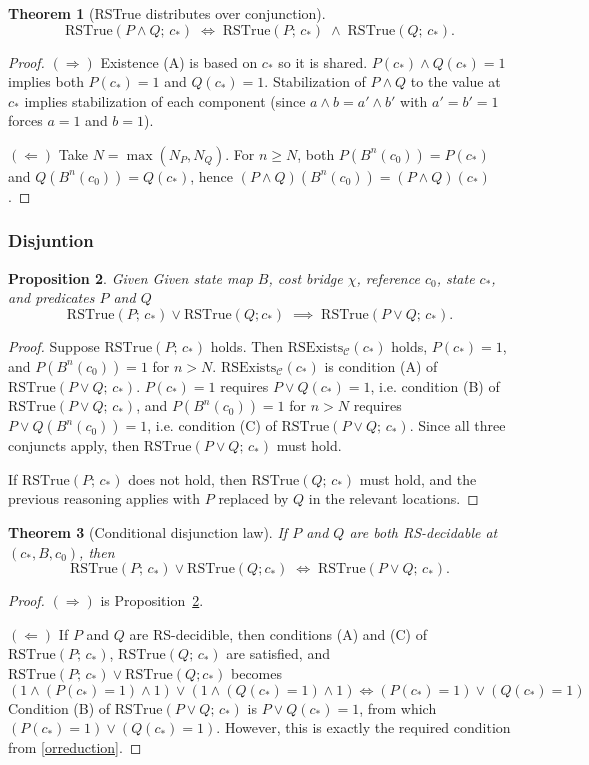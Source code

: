\documentclass[11pt,a4paper]{article}
\newcommand{\RSExists}{\mathrm{RSExists}}
\newcommand{\RSTrue}{\mathrm{RSTrue}}
\newtheorem{theorem}{Theorem}[section]
\newtheorem{proposition}[theorem]{Proposition}
\begin{document}
\begin{theorem}[RSTrue distributes over conjunction]\label{thm:and}
\[
  \RSTrue(P\land Q;\,c_*)
  \;\Longleftrightarrow\;
  \RSTrue(P;\,c_*) \;\land\; \RSTrue(Q;\,c_*).
\]
\end{theorem}
\begin{proof}
$(\Rightarrow)$  Existence (A) is based on $c_*$ so it is shared.  $P(c_*)\land Q(c_*)=1$
implies both $P(c_*)=1$ and $Q(c_*)=1$.  Stabilization of
$P\land Q$ to the value at $c_*$ implies stabilization of each
component (since $a\land b = a'\land b'$ with $a'=b'=1$ forces
$a=1$ and $b=1$).

$(\Leftarrow)$  Take $N=\max(N_P,N_Q)$.  For $n\ge N$, both
$P(B^n(c_0))=P(c_*)$ and $Q(B^n(c_0))=Q(c_*)$, hence
$(P\land Q)(B^n(c_0))=(P\land Q)(c_*)$.
\end{proof}

\subsubsection{Disjuntion}
\begin{proposition}
    Given Given state map $B$, cost bridge $\chi$, reference $c_0$, state $c_*$, and predicates $P$ and $Q$ \label{prop:or}
\[
  \RSTrue(P;\,c_*)\lor \RSTrue(Q;c_*)
  \;\implies\;
  \RSTrue(P\lor Q;\,c_*).
\]
\end{proposition}
\begin{proof}
Suppose $\RSTrue(P;\,c_*)$ holds. Then $\RSExists_{\mathcal{C}}(c_*)$ holds, $P(c_*)=1$, and $P(B^n(c_0))=1$ for $n>N$. $\RSExists_{\mathcal{C}}(c_*)$ is condition (A) of $\RSTrue(P\lor Q;\,c_*)$.  $P(c_*)=1$ requires $P\lor Q(c_*)=1$, i.e. condition (B) of $\RSTrue(P\lor Q;\,c_*)$, and $P(B^n(c_0))=1$ for $n>N$ requires $P\lor Q(B^n(c_0))=1$, i.e. condition (C) of $\RSTrue(P\lor Q;\,c_*)$. Since all three conjuncts apply, then  $\RSTrue(P\lor Q;\,c_*)$ must hold. 

If $\RSTrue(P;\,c_*)$ does not hold, then $\RSTrue(Q;\,c_*)$ must hold, and the previous reasoning applies with $P$ replaced by $Q$ in the relevant locations.
\end{proof}
\begin{theorem}[Conditional disjunction law]\label{thm:orlaw}
If $P$ and $Q$  are both RS-decidable at $(c_*,B,c_0)$, then
    \[
  \RSTrue(P;\,c_*)\lor \RSTrue(Q;c_*)
  \;\Leftrightarrow\;
  \RSTrue(P\lor Q;\,c_*).
\]
\end{theorem}
\begin{proof}
$(\Rightarrow)$ is Proposition~\ref{prop:or}.

$(\Leftarrow)$ If $P$ and $Q$ are RS-decidible, then conditions (A) and (C) of $\RSTrue(P;\,c_*)$, $\RSTrue(Q;\,c_*)$ are satisfied, and  $\RSTrue(P;\,c_*)\lor \RSTrue(Q;c_*)$ becomes 
\begin{equation}
    (1\land (P(c_*)=1) \land 1)\lor(1\land(Q(c_*)=1)\land1)\Leftrightarrow (P(c_*)=1)\lor (Q(c_*)=1) \label{orreduction}
\end{equation}
 Condition (B) of $\RSTrue(P\lor Q;\,c_*)$ is $P\lor Q(c_*)=1$, from which $(P(c_*)=1)\lor (Q(c_*)=1)$. However, this is exactly the required condition from \ref{orreduction}.
\end{proof}
\end{document}
